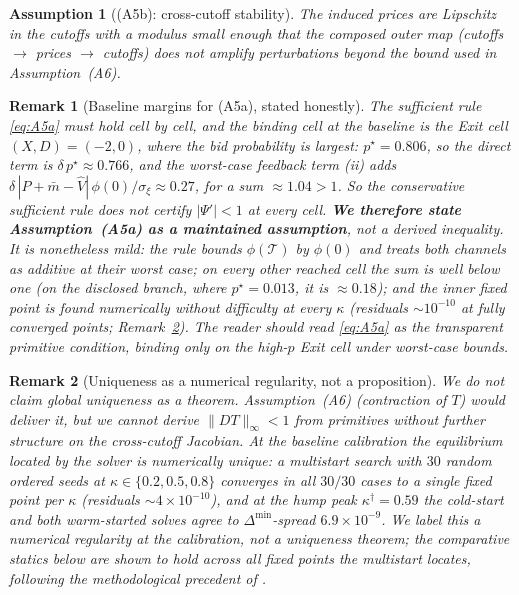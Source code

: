 \documentclass[11pt]{article}
\newcommand{\1}{\mathbf{1}}
\newtheorem{assumption}{Assumption}
\newtheorem{remark}{Remark}
\providecommand{\kp}{\kappa}
\providecommand{\Tmap}{T}
\providecommand{\Psifp}{\Psi}
\providecommand{\Dmin}{\Delta^{\min}}
\providecommand{\Vhat}{\hat{V}}
\providecommand{\sigxi}{\sigma_\xi}
\providecommand{\deltaliq}{\delta}
\begin{document}
\begin{assumption}[(A5b): cross-cutoff stability]
\label{ass:A5b}
The induced prices are Lipschitz in the cutoffs with a modulus small enough that the composed outer map (cutoffs $\to$ prices $\to$ cutoffs) does not amplify perturbations beyond the bound used in Assumption~\textup{(A6)}.
\end{assumption}

\begin{remark}[Baseline margins for (A5a), stated honestly]
\label{rem:A5margins}
The sufficient rule \eqref{eq:A5a} must hold cell by cell, and the binding cell at the baseline is the \emph{Exit} cell $(X,D)=(-2,0)$, where the bid probability is largest: $p^\star=0.806$, so the direct term is $\deltaliq\,p^\star\approx0.766$, and the worst-case feedback term (ii) adds $\deltaliq\,|P+\bar m-\Vhat|\,\phi(0)/\sigxi\approx0.27$, for a sum $\approx1.04>1$. So the conservative sufficient rule does \emph{not} certify $|\Psifp'|<1$ at every cell. \textbf{We therefore state Assumption~\textup{(A5a)} as a maintained assumption}, not a derived inequality. It is nonetheless mild: the rule bounds $\phi(\mathcal{T})$ by $\phi(0)$ and treats both channels as additive at their worst case; on every \emph{other} reached cell the sum is well below one (on the disclosed branch, where $p^\star=0.013$, it is $\approx0.18$); and the inner fixed point is found numerically without difficulty at every $\kp$ (residuals $\sim10^{-10}$ at fully converged points; Remark~\ref{rem:numreg}). The reader should read \eqref{eq:A5a} as the transparent primitive condition, binding only on the high-$p$ Exit cell under worst-case bounds.
\end{remark}

\begin{remark}[Uniqueness as a numerical regularity, not a proposition]
\label{rem:numreg}
We do not claim global uniqueness as a theorem. Assumption~\textup{(A6)} (contraction of $\Tmap$) would deliver it, but we cannot derive $\|D\Tmap\|_\infty<1$ from primitives without further structure on the cross-cutoff Jacobian. At the baseline calibration the equilibrium located by the solver is numerically unique: a multistart search with $30$ random ordered seeds at $\kappa\in\{0.2,0.5,0.8\}$ converges in all $30/30$ cases to a single fixed point per $\kappa$ (residuals $\sim4\times10^{-10}$), and at the hump peak $\kappa^\dagger=0.59$ the cold-start and both warm-started solves agree to $\Dmin$-spread $6.9\times10^{-9}$. We label this a \emph{numerical regularity} at the calibration, not a uniqueness theorem; the comparative statics below are shown to hold across all fixed points the multistart locates, following the methodological precedent of \citet{EdmansGoldsteinJiang2015}.
\end{remark}
\end{document}
